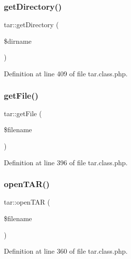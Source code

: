 \hypertarget{classtar_a02157ed6604bec5f931ad08d1c5c048f}{}\label{classtar_a02157ed6604bec5f931ad08d1c5c048f} 
\subsubsection{\texorpdfstring{get\+Directory()}{getDirectory()}}
{\footnotesize\ttfamily tar\+::get\+Directory (\begin{DoxyParamCaption}\item[{}]{\$dirname }\end{DoxyParamCaption})}



Definition at line 409 of file tar.\+class.\+php.

\hypertarget{classtar_a8eb93e97f657daf1a3671c60f7093745}{}\label{classtar_a8eb93e97f657daf1a3671c60f7093745} 
\subsubsection{\texorpdfstring{get\+File()}{getFile()}}
{\footnotesize\ttfamily tar\+::get\+File (\begin{DoxyParamCaption}\item[{}]{\$filename }\end{DoxyParamCaption})}



Definition at line 396 of file tar.\+class.\+php.

\hypertarget{classtar_a62fc429d1e33de90d1ce65c3c16a4193}{}\label{classtar_a62fc429d1e33de90d1ce65c3c16a4193} 
\subsubsection{\texorpdfstring{open\+T\+A\+R()}{openTAR()}}
{\footnotesize\ttfamily tar\+::open\+T\+AR (\begin{DoxyParamCaption}\item[{}]{\$filename }\end{DoxyParamCaption})}



Definition at line 360 of file tar.\+class.\+php.

\hypertarget{classtar_a17971edb42a8be66b554ca5d6cf6bc1e}{}\label{classtar_a17971edb42a8be66b554ca5d6cf6bc1e} 
